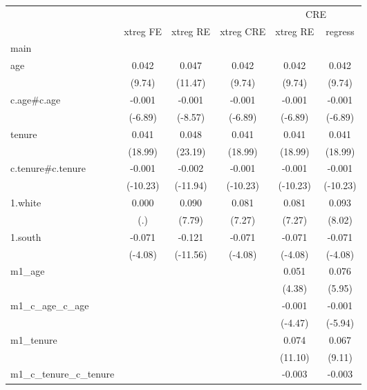 
\begin{tabular}{l*{5}{c}}
\hline\hline&\multicolumn{3}{c}{}&\multicolumn{2}{c}{CRE}\\
 &xtreg FE&xtreg RE&xtreg CRE &xtreg RE& regress\\
\hline
main        &            &            &            &            &            \\
age         &       0.042&       0.047&       0.042&       0.042&       0.042\\
            &      (9.74)&     (11.47)&      (9.74)&      (9.74)&      (9.74)\\
c.age\#c.age &      -0.001&      -0.001&      -0.001&      -0.001&      -0.001\\
            &     (-6.89)&     (-8.57)&     (-6.89)&     (-6.89)&     (-6.89)\\
tenure      &       0.041&       0.048&       0.041&       0.041&       0.041\\
            &     (18.99)&     (23.19)&     (18.99)&     (18.99)&     (18.99)\\
c.tenure\#c.tenure&      -0.001&      -0.002&      -0.001&      -0.001&      -0.001\\
            &    (-10.23)&    (-11.94)&    (-10.23)&    (-10.23)&    (-10.23)\\
1.white     &       0.000&       0.090&       0.081&       0.081&       0.093\\
            &         (.)&      (7.79)&      (7.27)&      (7.27)&      (8.02)\\
1.south     &      -0.071&      -0.121&      -0.071&      -0.071&      -0.071\\
            &     (-4.08)&    (-11.56)&     (-4.08)&     (-4.08)&     (-4.08)\\
m1\_age      &            &            &            &       0.051&       0.076\\
            &            &            &            &      (4.38)&      (5.95)\\
m1\_c\_age\_c\_age&            &            &            &      -0.001&      -0.001\\
            &            &            &            &     (-4.47)&     (-5.94)\\
m1\_tenure   &            &            &            &       0.074&       0.067\\
            &            &            &            &     (11.10)&      (9.11)\\
m1\_c\_tenure\_c\_tenure&            &            &            &      -0.003&      -0.003\\

\end{tabular}
